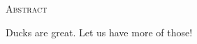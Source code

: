 \begin{center}
  \textsc{Abstract}
\end{center}
%
\noindent
%
Ducks are great. Let us have more of those!
